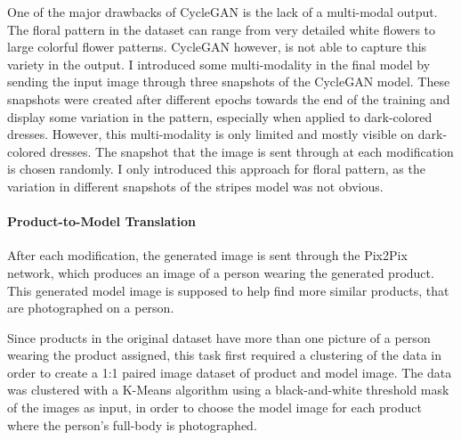 \documentclass[12pt]{report}
\begin{document}
One of the major drawbacks of CycleGAN is the lack of a multi-modal output. The floral pattern in the dataset can range from very detailed white flowers to large colorful flower patterns. CycleGAN however, is not able to capture this variety in the output. I introduced some multi-modality in the final model by sending the input image through three snapshots of the CycleGAN model. These snapshots were created after different epochs towards the end of the training and display some variation in the pattern, especially when applied to dark-colored dresses. However, this multi-modality is only limited and mostly visible on dark-colored dresses. The snapshot that the image is sent through at each modification is chosen randomly. I only introduced this approach for floral pattern, as the variation in different snapshots of the stripes model was not obvious.

%



\paragraph{Product-to-Model Translation}
After each modification, the generated image is sent through the Pix2Pix network, which produces an image of a person wearing the generated product. This generated model image is supposed to help find more similar products, that are photographed on a person.

Since products in the original dataset have more than one picture of a person wearing the product assigned, this task first required a clustering of the data in order to create a 1:1 paired image dataset of product and model image. The data was clustered with a K-Means algorithm using a black-and-white threshold mask of the images as input, in order to choose the model image for each product where the person's full-body is photographed.
\end{document}
